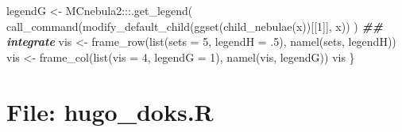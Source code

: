 \documentclass[
]{article}
\newenvironment{Shaded}{\begin{snugshade}}{\end{snugshade}}
\newcommand{\AttributeTok}[1]{\textcolor[rgb]{0.77,0.63,0.00}{#1}}
\newcommand{\DecValTok}[1]{\textcolor[rgb]{0.00,0.00,0.81}{#1}}
\newcommand{\DocumentationTok}[1]{\textcolor[rgb]{0.56,0.35,0.01}{\textbf{\textit{#1}}}}
\newcommand{\FunctionTok}[1]{\textcolor[rgb]{0.00,0.00,0.00}{#1}}
\newcommand{\NormalTok}[1]{#1}
\newcommand{\OtherTok}[1]{\textcolor[rgb]{0.56,0.35,0.01}{#1}}
\newcommand{\SpecialCharTok}[1]{\textcolor[rgb]{0.00,0.00,0.00}{#1}}
\begin{document}
\begin{Shaded}
\begin{Highlighting}[]
\NormalTok{  legendG }\OtherTok{\textless{}{-}}\NormalTok{ MCnebula2}\SpecialCharTok{:::}\FunctionTok{.get\_legend}\NormalTok{(}
    \FunctionTok{call\_command}\NormalTok{(}\FunctionTok{modify\_default\_child}\NormalTok{(}\FunctionTok{ggset}\NormalTok{(}\FunctionTok{child\_nebulae}\NormalTok{(x))[[}\DecValTok{1}\NormalTok{]], x))}
\NormalTok{  )}
  \DocumentationTok{\#\# integrate}
\NormalTok{  vis }\OtherTok{\textless{}{-}} \FunctionTok{frame\_row}\NormalTok{(}\FunctionTok{list}\NormalTok{(}\AttributeTok{sets =} \DecValTok{5}\NormalTok{, }\AttributeTok{legendH =}\NormalTok{ .}\DecValTok{5}\NormalTok{), }\FunctionTok{namel}\NormalTok{(sets, legendH))}
\NormalTok{  vis }\OtherTok{\textless{}{-}} \FunctionTok{frame\_col}\NormalTok{(}\FunctionTok{list}\NormalTok{(}\AttributeTok{vis =} \DecValTok{4}\NormalTok{, }\AttributeTok{legendG =} \DecValTok{1}\NormalTok{), }\FunctionTok{namel}\NormalTok{(vis, legendG))}
\NormalTok{  vis}
\NormalTok{\}}
\end{Highlighting}
\end{Shaded}

\hypertarget{file-hugo_doks.r}{%
\section{File: hugo\_doks.R}\label{file-hugo_doks.r}}
\end{document}
